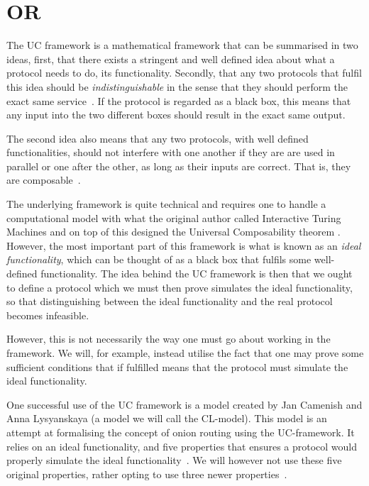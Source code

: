 \section{ \acl*{OR}}%
\label{UCOR}
The \ac{UC} framework is a mathematical framework that can be summarised in
two ideas, first, that there exists a stringent and well defined idea
about what a protocol needs to do, its functionality. Secondly, that
any two protocols that fulfil this idea should be {\it
  indistinguishable\/} in the sense that they should perform the exact
same service~\cite{UniversalComposability}. If the protocol is regarded as a black box, this means
that any input into the two different boxes should result in the
exact same output.

The second idea also means that any two protocols, with well defined
functionalities, should not interfere with one another if they are
are used in parallel or one after the other, as long as their inputs
are correct. That is, they are composable~\cite{UniversalComposability}.

The underlying framework is quite technical and requires one to handle
a computational model with what the original author %
called Interactive Turing Machines and on top of this designed the
Universal Composability theorem \cite{UniversalComposability}. However, the most important part of
this framework is what is known as an \emph{ideal functionality}, which
can be thought of as a black box that fulfils some well-defined
functionality\cite{UniversalComposability}. The idea behind the \ac{UC} framework is then that we ought
to define a protocol which we must then prove simulates the ideal
functionality, so that distinguishing between the ideal functionality
and the real protocol becomes infeasible.

However, this is not necessarily the way one must go about working in
the framework. We will, for example, instead utilise the fact that one
may prove some sufficient conditions that if fulfilled means that the
protocol must simulate the ideal functionality.

One  successful use of the \ac{UC} framework is a model
created by Jan Camenish and Anna Lysyanskaya (a model we will call the
CL-model). This model is an attempt at formalising the concept of
onion routing using the UC-framework. It relies on an ideal
functionality, and five properties that ensures a protocol would properly
simulate the ideal functionality~\cite{CL-model}. We will however not
use these five original properties, rather opting to use three newer
properties~\cite{kuhn}.

